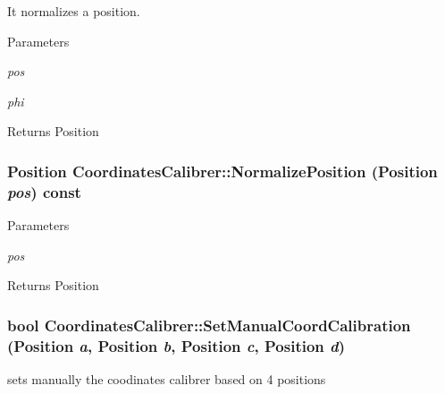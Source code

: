It normalizes a position. 


\begin{DoxyParams}{Parameters}
\item[{\em pos}]\item[{\em phi}]\end{DoxyParams}
\begin{DoxyReturn}{Returns}
Position 
\end{DoxyReturn}
\hypertarget{classCoordinatesCalibrer_ad6519b69842756c256922d14d1e248ce}{
\subsubsection[{NormalizePosition}]{\setlength{\rightskip}{0pt plus 5cm}Position CoordinatesCalibrer::NormalizePosition (Position {\em pos}) const}}
\label{classCoordinatesCalibrer_ad6519b69842756c256922d14d1e248ce}

\begin{DoxyParams}{Parameters}
\item[{\em pos}]\end{DoxyParams}
\begin{DoxyReturn}{Returns}
Position 
\end{DoxyReturn}
\hypertarget{classCoordinatesCalibrer_a006c18905b14e4780b9fc74fe26649fc}{
\subsubsection[{SetManualCoordCalibration}]{\setlength{\rightskip}{0pt plus 5cm}bool CoordinatesCalibrer::SetManualCoordCalibration (Position {\em a}, \/  Position {\em b}, \/  Position {\em c}, \/  Position {\em d})}}
\label{classCoordinatesCalibrer_a006c18905b14e4780b9fc74fe26649fc}


sets manually the coodinates calibrer based on 4 positions 


